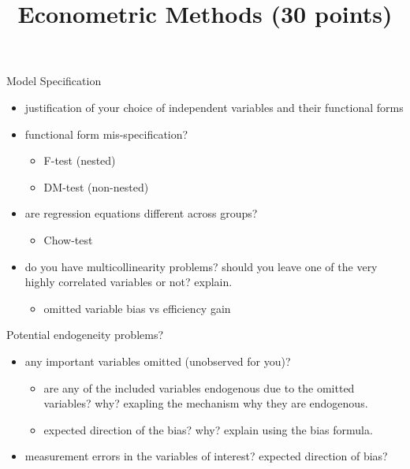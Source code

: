 \documentclass[fleqn]{beamer}\usepackage[]{graphicx}\usepackage[]{color}
\begin{document}
\begin{frame}
\title{Econometric Methods (30 points)}
\author{}
\date{}
\titlepage
\end{frame}

\begin{frame}[c]
  \begin{block}{Model Specification}  
    \begin{itemize}
      \item justification of your choice of independent variables and their functional forms
      \item functional form mis-specification? 
      \begin{itemize}
        \item F-test (nested)
        \item DM-test (non-nested) 
      \end{itemize}
      \item are regression equations different across groups?
      \begin{itemize}
        \item Chow-test
      \end{itemize} 
      \item do you have multicollinearity problems? should you leave one of the very highly correlated variables or not? explain.
        \begin{itemize}
          \item omitted variable bias vs efficiency gain
        \end{itemize}
    \end{itemize}
  \end{block}
\end{frame}

\begin{frame}[c]
\begin{block}{Potential endogeneity problems?}  
  \begin{itemize}
    \item any important variables omitted (unobserved for you)?
    \begin{itemize}
      \item are any of the included variables endogenous due to the omitted variables? why? exapling the mechanism why they are endogenous.
      \item expected direction of the bias? why? explain using the bias formula.
    \end{itemize}
      \item measurement errors in the variables of interest? expected direction of bias?
  \end{itemize}  
\end{block}
\end{frame}
\end{document}
